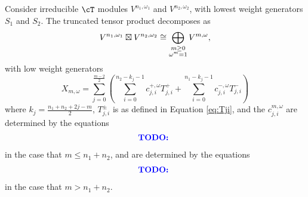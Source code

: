 \documentclass{article}
\begin{document}
\begin{thm}
Consider irreducible $\cT$ modules $V^{n_1, \omega_1}$ and $V^{n_2, \omega_2}$, with lowest weight generators $S_1$ and $S_2$.
The truncated tensor product decomposes as
$$
V^{n_1, \omega_1} \boxtimes V^{n_2, \omega_2} 
\cong 
\bigoplus_{\substack{m \geq 0 \\ \omega^m = 1}} V^{m, \omega},
$$
with low weight generators 
$$
X_{m, \omega} 
= 
\sum_{j=0}^{\frac{m-2}{2}}
\left(
\sum_{i=0}^{n_2-k_j-1} 
c^{+,\omega}_{j,i} T^+_{j,i}
+
\sum_{i=0}^{n_1-k_j-1} 
c^{-,\omega}_{j,i} T^-_{j,i}
\right)
$$
where
$k_j = \frac{n_1+n_2+2j-m}{2}$, $T_{j,i}^\pm$ is as defined in Equation \eqref{eq:Tji}, and the $c^{m, \omega}_{j,i}$ are determined by the equations
\begin{align*}
\textcolor{blue}{\textbf{TODO: }}
\end{align*}
in the case that $m \leq n_1 + n_2$, and are determined by the equations
\begin{align*}
\textcolor{blue}{\textbf{TODO: }}
\end{align*}
in the case that $m > n_1 + n_2$.
\end{thm}
\end{document}
